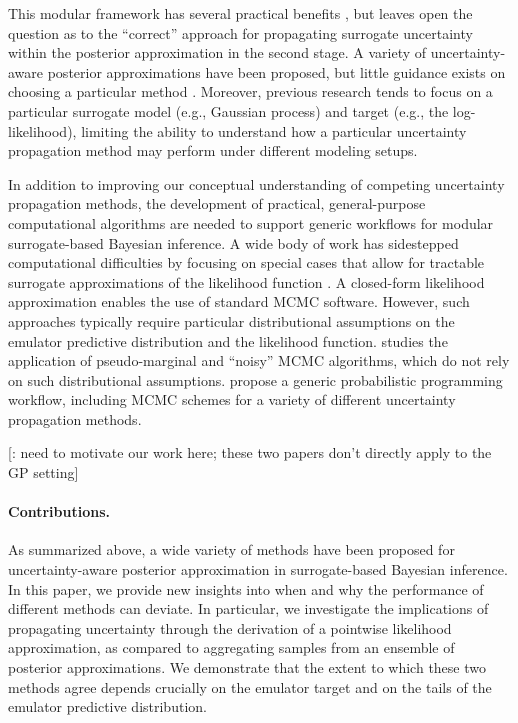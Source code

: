 \documentclass[12pt]{article}
\begin{document}
This modular framework 
has several practical benefits \citep{modularization,PlummerCut}, but leaves open the 
question as to the ``correct'' approach for propagating surrogate uncertainty within the 
posterior approximation in the second stage. A variety of uncertainty-aware posterior 
approximations have been proposed, but little guidance exists on choosing a particular 
method \citep{reviewPaper,BilionisBayesSurrogates,StuartTeck1,VehtariParallelGP,
BurknerSurrogate,BurknerTwoStep,FerEmulation}. Moreover, previous research 
tends to focus on a particular surrogate model (e.g., Gaussian process) and target 
(e.g., the log-likelihood), limiting the ability to understand how a particular 
uncertainty propagation method may perform under different modeling setups. 
 
In addition to improving our conceptual understanding of competing uncertainty 
propagation methods, the development of practical, general-purpose computational 
algorithms are needed to support generic workflows for modular surrogate-based 
Bayesian inference. A wide body of work has sidestepped computational difficulties
by focusing on special cases that allow for tractable surrogate approximations of the 
likelihood function 
\citep{StuartTeck1,GP_PDE_priors,hydrologicalModel,hydrologicalModel2,
Surer2023sequential,VillaniAdaptiveGP,weightedIVAR,idealizedGCM,CES,
FATES_CES,VehtariParallelGP,quantileApprox}. A closed-form likelihood approximation
enables the use of standard MCMC software. However, such approaches typically require 
particular distributional assumptions on the emulator predictive distribution and the 
likelihood function. \citep{garegnani2021NoisyMCMC} studies the application of 
pseudo-marginal and ``noisy'' MCMC algorithms, which do not rely on such distributional
assumptions. \citep{BurknerSurrogate} propose a generic probabilistic programming workflow,
including MCMC schemes for a variety of different uncertainty propagation methods. 

[\todo: need to motivate our work here; these two papers don't directly apply to the GP setting]

\paragraph{Contributions.}
As summarized above, a wide variety of methods have been proposed for 
uncertainty-aware posterior approximation in surrogate-based Bayesian inference. 
In this paper, we provide new insights into when and why the performance of different 
methods can deviate. In particular, we investigate the implications of propagating
uncertainty through the derivation of a pointwise likelihood approximation, as compared 
to aggregating samples from an ensemble of posterior approximations. We demonstrate 
that the extent to which these two methods agree depends crucially on the emulator 
target and on the tails of the emulator predictive distribution. 
\end{document}
